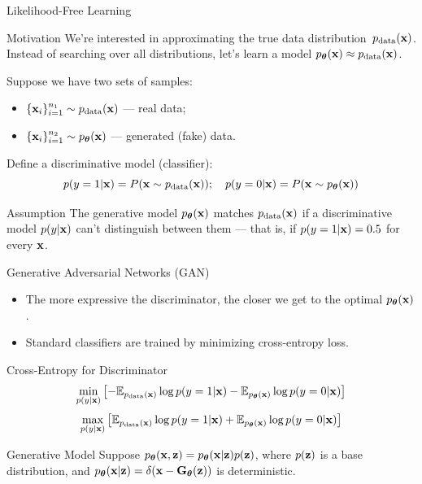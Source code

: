 \documentclass{beamer}
\begin{document}
\begin{frame}{Likelihood-Free Learning}
	\begin{block}{Motivation}
	 We're interested in approximating the true data distribution~$p_{\text{data}}(\mathbf{x})$.
	Instead of searching over all distributions, let's learn a model $p_{\boldsymbol{\theta}}(\mathbf{x}) \approx p_{\text{data}}(\mathbf{x})$.
	\end{block}
	\eqpause
	Suppose we have two sets of samples: 
	\begin{itemize}
		\item $\{\mathbf{x}_i\}_{i=1}^{n_1} \sim p_{\text{data}}(\mathbf{x})$ — real data;
		\item $\{\mathbf{x}_i\}_{i=1}^{n_2} \sim p_{\boldsymbol{\theta}}(\mathbf{x})$ — generated (fake) data.
	\end{itemize}
	\eqpause
	Define a discriminative model (classifier):
	\[
		p(y = 1 | \mathbf{x}) = P(\mathbf{x} \sim p_{\text{data}}(\mathbf{x})); \quad p(y = 0 | \mathbf{x}) = P(\mathbf{x} \sim p_{\boldsymbol{\theta}}(\mathbf{x}))
	\]
	\eqpause
	\vspace{-0.5cm}
	\begin{block}{Assumption}
		The generative model $p_{\boldsymbol{\theta}}(\mathbf{x})$ matches $p_{\text{data}}(\mathbf{x})$ if a discriminative model $p(y | \mathbf{x})$ can't distinguish between them --- that is, if $p(y = 1 | \mathbf{x}) = 0.5$ for every $\mathbf{x}$.
	\end{block}
\end{frame}
\begin{frame}{Generative Adversarial Networks (GAN)}
	\begin{itemize}
		\item The more expressive the discriminator, the closer we get to the optimal $p_{\boldsymbol{\theta}}(\mathbf{x})$.
		\item Standard classifiers are trained by minimizing cross-entropy loss.
	\end{itemize}
	\eqpause
	\begin{block}{Cross-Entropy for Discriminator}
		\vspace{-0.3cm}
		\[
			\min_{p(y | \mathbf{x})} \left[ - \mathbb{E}_{p_{\text{data}}(\mathbf{x})} \log p(y = 1 | \mathbf{x}) - \mathbb{E}_{p_{\boldsymbol{\theta}}(\mathbf{x})} \log p(y = 0 | \mathbf{x}) \right] 
		\]
		\[
			\max_{p(y | \mathbf{x})} \left[\mathbb{E}_{p_{\text{data}}(\mathbf{x})} \log p(y = 1 | \mathbf{x}) + \mathbb{E}_{p_{\boldsymbol{\theta}}(\mathbf{x})} \log p(y = 0 | \mathbf{x}) \right] 
		\]
	\end{block}
	\eqpause
	\vspace{-0.3cm}
	\begin{block}{Generative Model}
		Suppose $p_{\boldsymbol{\theta}}(\mathbf{x}, \mathbf{z}) = p_{\boldsymbol{\theta}}(\mathbf{x}| \mathbf{z}) p(\mathbf{z})$, where $p(\mathbf{z})$ is a base distribution, and $p_{\boldsymbol{\theta}}(\mathbf{x} | \mathbf{z}) = \delta (\mathbf{x} - \mathbf{G}_{\boldsymbol{\theta}}(\mathbf{z}))$ is deterministic.
	\end{block}
\end{frame}
\end{document}
